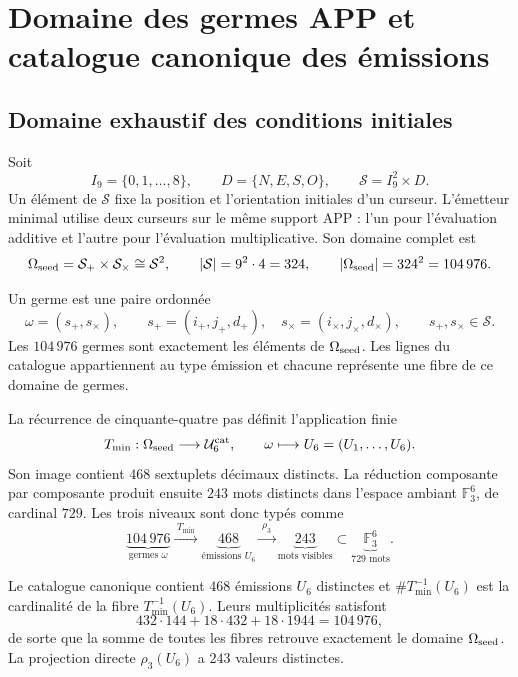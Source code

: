 \chapter{Domaine des germes APP et catalogue canonique des émissions}
\label{app:catalogo-semillas-app-rev9}

\section{Domaine exhaustif des conditions initiales}

Soit
\[
 I_9=\{0,1,\ldots,8\},
 \qquad D=\{N,E,S,O\},
 \qquad \mathcal S=I_9^2\times D.
\]
Un élément de \(\mathcal S\) fixe la position et l'orientation initiales d'un
curseur. L'émetteur minimal utilise deux curseurs sur le même support APP :
l'un pour l'évaluation additive et l'autre pour l'évaluation multiplicative. Son
domaine complet est
\[
 \Omega_{\rm seed}
 =\mathcal S_{+}\times\mathcal S_{\times}
 \cong\mathcal S^2,
 \qquad
 |\mathcal S|=9^2\cdot4=324,
 \qquad
 |\Omega_{\rm seed}|=324^2=104\,976.
\]

\begin{definition}
Un germe est une paire ordonnée
\[
 \omega=(s_+,s_\times),
 \qquad
 s_+=(i_+,j_+,d_+),\quad
 s_\times=(i_\times,j_\times,d_\times),
 \qquad s_+,s_\times\in\mathcal S.
\]
Les \(104\,976\) germes sont exactement les éléments de
\(\Omega_{\rm seed}\). Les lignes du catalogue appartiennent au type émission et
chacune représente une fibre de ce domaine de germes.
\end{definition}

La récurrence de cinquante-quatre pas définit l'application finie
\[
 T_{\min}:\Omega_{\rm seed}\longrightarrow\mathcal U_6^{\rm cat},
 \qquad
 \omega\longmapsto U_6=(U_1,\ldots,U_6).
\]
Son image contient \(468\) sextuplets décimaux distincts. La réduction
composante par composante produit ensuite \(243\) mots distincts dans
l'espace ambiant \(\mathbb F_3^6\), de cardinal \(729\). Les trois niveaux
sont donc typés comme
\[
 \underbrace{104\,976}_{\text{germes }\omega}
 \xrightarrow{\;T_{\min}\;}
 \underbrace{468}_{\text{émissions }U_6}
 \xrightarrow{\;\rho_3\;}
 \underbrace{243}_{\text{mots visibles}}
 \subset
 \underbrace{\mathbb F_3^6}_{729\text{ mots}}.
\]

\begin{theorem}
Le catalogue canonique contient \(468\) émissions \(U_6\) distinctes et
\(\#T_{\min}^{-1}(U_6)\) est la cardinalité de la fibre
\(T_{\min}^{-1}(U_6)\). Leurs multiplicités satisfont
\[
 432\cdot144+18\cdot432+18\cdot1944=104\,976,
\]
de sorte que la somme de toutes les fibres retrouve exactement le domaine
\(\Omega_{\rm seed}\). La projection directe
\(\rho_3(U_6)\) a \(243\) valeurs distinctes.
\end{theorem}

